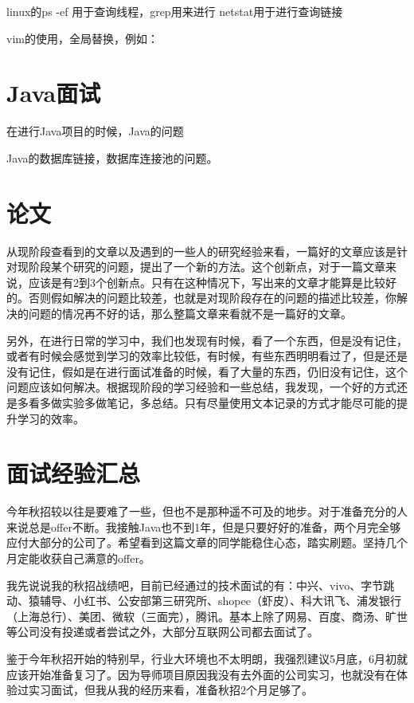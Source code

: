 \documentclass[UTF8]{ctexart}
\begin{document}
linux的ps -ef 用于查询线程，grep用来进行
netstat用于进行查询链接

vim的使用，全局替换，例如：%

\section{Java面试}

在进行Java项目的时候，Java的问题

Java的数据库链接，数据库连接池的问题。



\section{论文}

从现阶段查看到的文章以及遇到的一些人的研究经验来看，一篇好的文章应该是针对现阶段某个研究的问题，提出了一个新的方法。这个创新点，对于一篇文章来说，应该是有2到3个创新点。只有在这种情况下，写出来的文章才能算是比较好的。否则假如解决的问题比较差，也就是对现阶段存在的问题的描述比较差，你解决的问题的情况再不好的话，那么整篇文章来看就不是一篇好的文章。

另外，在进行日常的学习中，我们也发现有时候，看了一个东西，但是没有记住，或者有时候会感觉到学习的效率比较低，有时候，有些东西明明看过了，但是还是没有记住，假如是在进行面试准备的时候，看了大量的东西，仍旧没有记住，这个问题应该如何解决。根据现阶段的学习经验和一些总结，我发现，一个好的方式还是多看多做实验多做笔记，多总结。只有尽量使用文本记录的方式才能尽可能的提升学习的效率。


\section{面试经验汇总}

今年秋招较以往是要难了一些，但也不是那种遥不可及的地步。对于准备充分的人来说总是offer不断。我接触Java也不到1年，但是只要好好的准备，两个月完全够应付大部分的公司了。希望看到这篇文章的同学能稳住心态，踏实刷题。坚持几个月定能收获自己满意的offer。

我先说说我的秋招战绩吧，目前已经通过的技术面试的有：中兴、vivo、字节跳动、猿辅导、小红书、公安部第三研究所、shopee（虾皮）、科大讯飞、浦发银行（上海总行）、美团、微软（三面完），腾讯。基本上除了网易、百度、商汤、旷世等公司没有投递或者尝试之外，大部分互联网公司都去面试了。

鉴于今年秋招开始的特别早，行业大环境也不太明朗，我强烈建议5月底，6月初就应该开始准备复习了。因为导师项目原因我没有去外面的公司实习，也就没有在体验过实习面试，但我从我的经历来看，准备秋招2个月足够了。
\end{document}
